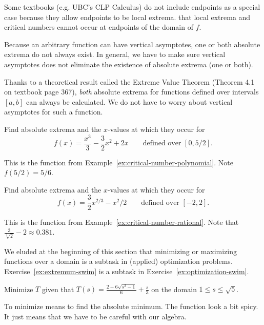 \documentclass[../main.tex]{subfiles}
\begin{document}

{\footnotesize \faExclamationTriangle{} Some textbooks (e.g. UBC's CLP Calculus) do not include endpoints as a special case because they allow endpoints to be local extrema.  that local extrema and critical numbers cannot occur at endpoints of the domain of \(f\).}

Because an arbitrary function can have vertical asymptotes, one or both absolute extrema do not always exist. In general, we have to make sure vertical asymptotes does not eliminate the existence of absolute extrema (one or both).



Thanks to a theoretical result called the Extreme Value Theorem (Theorem 4.1 on textbook page 367), \emph{both} absolute extrema for  functions defined over  intervals \([a,b]\) can always be calculated. We do not have to worry about vertical asymptotes for such a function.



\clearpage

\begin{example} \label{ex:closed-interval-method-intro}
  Find absolute extrema and the \(x\)-values at which they occur for 
  \[
    f(x) = \frac{x^{3}}{3} - \frac{3}{2}x^{2} + 2x \qquad\text{defined over }[0,5/2].
  \]

  This is the function from Example~\ref{ex:critical-number-polynomial}. Note \(f(5/2) = 5/6\). 

\end{example}

\begin{example} 
  Find absolute extrema and the \(x\)-values at which they occur for 
  \[
    f(x) = \frac{3}{2} x^{2/3} - x^{2}/2 \qquad\text{defined over } [-2,2].
  \]

  This is the function from Example~\ref{ex:critical-number-rational}. Note that \(\frac{3}{\sqrt[3]{2}}-2 \approx 0.381\).

\end{example}
\clearpage

We eluded at the beginning of this section that minimizing or maximizing functions over a domain is a subtask in (applied) optimization problems.
Exercise~\ref{ex:extremum-swim} is a subtask in Exercise~\ref{ex:optimization-swim}.
\begin{exercise} \label{ex:extremum-swim}
  Minimize \(T\) given that \(T(s) = \frac{2 - 6 \sqrt{s^{2} - 1}}{6} + \frac{s}{3}\) on the domain \(1 \le s \le \sqrt{5}\).

  To minimize means to find the absolute minimum.  The function look a bit spicy. It just means that we have to be careful with our algebra. 

\end{exercise}
\clearpage
\end{document}
